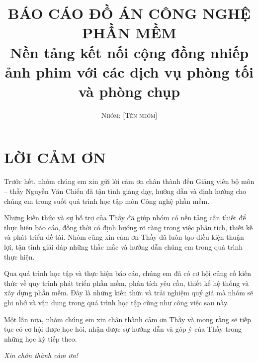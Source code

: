 \documentclass[a4paper,11pt,oneside]{book}
\title{
	\Huge \textbf{BÁO CÁO ĐỒ ÁN CÔNG NGHỆ PHẦN MỀM}
	\\
	\huge Nền tảng kết nối cộng đồng nhiếp ảnh phim với các dịch vụ phòng tối và phòng chụp
}
\author{\textsc{Nhóm: [Tên nhóm]}}
\begin{document}
	
	
	\frontmatter
	
	
	
	
	\clearpage
	
	\chapter*{LỜI CẢM ƠN}
	
	\vspace{0.8cm}
	
	\noindent
	Trước hết, nhóm chúng em xin gửi lời cảm ơn chân thành đến Giảng viên bộ môn – thầy Nguyễn Văn Chiến đã tận tình giảng dạy, hướng dẫn và định hướng cho chúng em trong suốt quá trình học tập môn Công nghệ phần mềm.
	
	\vspace{0.4cm}
	
	\noindent
	Những kiến thức và sự hỗ trợ của Thầy đã giúp nhóm có nền tảng cần thiết để thực hiện báo cáo, đồng thời có định hướng rõ ràng trong việc phân tích, thiết kế và phát triển đề tài. Nhóm cũng xin cảm ơn Thầy đã luôn tạo điều kiện thuận lợi, tận tình giải đáp những thắc mắc và hướng dẫn chúng em trong quá trình thực hiện.
	
	\vspace{0.4cm}
	
	\noindent
	Qua quá trình học tập và thực hiện báo cáo, chúng em đã có cơ hội củng cố kiến thức về quy trình phát triển phần mềm, phân tích yêu cầu, thiết kế hệ thống và xây dựng phần mềm. Đây là những kiến thức và trải nghiệm quý giá mà nhóm sẽ ghi nhớ và vận dụng trong quá trình học tập cũng như công việc sau này.
	
	\vspace{0.4cm}
	
	\noindent
	Một lần nữa, nhóm chúng em xin chân thành cảm ơn Thầy và mong rằng sẽ tiếp tục có cơ hội được học hỏi, nhận được sự hướng dẫn và góp ý của Thầy trong những học kỳ tiếp theo.
	
	\vspace{0.5cm}
	
	\begin{flushright}
		\textit{Xin chân thành cảm ơn!}
	\end{flushright}
	
\end{document}

